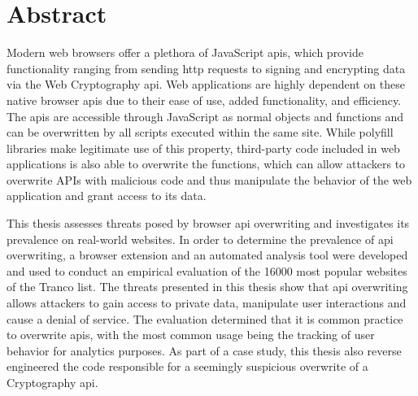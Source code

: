 {\let\clearpage\relax
\chapter*{Abstract}
}

Modern web browsers offer a plethora of JavaScript \acsp{api}, which provide functionality ranging from sending \acs{http} requests to signing and encrypting data via the Web Cryptography \acs{api}. Web applications are highly dependent on these native browser \acsp{api} due to their ease of use, added functionality, and efficiency. The \acsp{api} are accessible through JavaScript as normal objects and functions and can be overwritten by all scripts executed within the same site. While polyfill libraries make legitimate use of this property, third-party code included in web applications is also able to overwrite the functions, which can allow attackers to overwrite APIs with malicious code and thus manipulate the behavior of the web application and grant access to its data.

This thesis assesses threats posed by browser \acs{api} overwriting and investigates its prevalence on real-world websites. In order to determine the prevalence of \acs{api} overwriting, a browser extension and an automated analysis tool were developed and used to conduct an empirical evaluation of the \num[round-precision=0]{16000} most popular websites of the Tranco list. The threats presented in this thesis show that \acs{api} overwriting allows attackers to gain access to private data, manipulate user interactions and cause a denial of service. The evaluation determined that it is common practice to overwrite \acsp{api}, with the most common usage being the tracking of user behavior for analytics purposes. As part of a case study, this thesis also reverse engineered the code responsible for a seemingly suspicious overwrite of a Cryptography \acs{api}.
